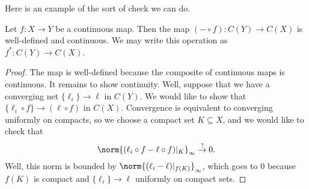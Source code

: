 \documentclass[notes.tex]{subfiles}
\begin{document}
Here is an example of the sort of check we can do.
\begin{example} \label{ex:pushforward-cont}
	Let $f\colon X\to Y$ be a continuous map. Then the map $(-\circ f)\colon C(Y)\to C(X)$ is well-defined and continuous.
	We may write this operation as $f^*\colon C(Y)\to C(X)$.
\end{example}
\begin{proof}
	The map is well-defined because the composite of continuous maps is continuous. It remains to show continuity. Well, suppose that we have a converging net $\{\ell_i\}\to\ell$ in $C(Y)$. We would like to show that $\{\ell_i\circ f\}\to(\ell\circ f)$ in $C(X)$. Convergence is equivalent to converging uniformly on compacts, so we choose a compact set $K\subseteq X$, and we would like to check that
	\[\norm{(\ell_i\circ f-\ell\circ f)|_K}_\infty\stackrel?\to0.\]
	Well, this norm is bounded by $\norm{(\ell_i-\ell)|_{f(K)}}_\infty$, which goes to $0$ because $f(K)$ is compact and $\{\ell_i\}\to\ell$ uniformly on compact sets.
\end{proof}
\end{document}
